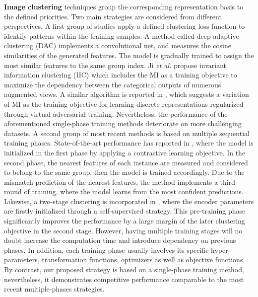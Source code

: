 \documentclass[journal]{IEEEtran}
\begin{document}
\par
\textbf{Image clustering} techniques group the corresponding representation basis to the defined priorities. Two main strategies are considered from different perspectives. A first group of studies \cite{DBLP:conf/iccv/ChangWMXP17,Ji_2019_ICCV, Yang2016JointUL,zhao2020deep} apply a defined clustering loss function to identify patterns within the training samples. A method called deep adaptive clustering (DAC) \cite{8237888} implements a convolutional net, and measures the cosine similarities of the generated features. The model is gradually trained to assign the most similar features to the same group index. Ji \textit{et al.} propose invariant information clustering (IIC) \cite{Ji_2019_ICCV} which includes the MI as a training objective to maximize the dependency between the categorical outputs of numerous augmented views. A similar algorithm is reported in \cite{Hu2017}, which suggests a variation of MI as the training objective for learning discrete representations regularized through virtual adversarial training. Nevertheless, the performance of the aforementioned single-phase training methods deteriorate on more challenging datasets. A second group of most recent methods is based on multiple sequential training phases. State-of-the-art performance has reported in \cite{vangansbeke2020scan}, where the model is initialized in the first phase by applying a contrastive learning objective. In the second phase, the  nearest features of each instance are measured and considered to belong to the same group, then the model is trained accordingly. Due to the mismatch prediction of the  nearest features, the method implements a third round of training, where the model learns from the most confident predictions. Likewise, a two-stage clustering is incorporated in \cite{eccv_han}, where the encoder parameters are firstly initialized through a self-supervised strategy. This pre-training phase significantly improves the performance by a large margin of the later clustering objective in the second stage. However, having multiple training stages will no doubt increase the computation time and introduce dependency on previous phases. In addition, each training phase usually involves its specific  hyper-parameters, transformation functions, optimizers as well as objective functions. By contrast, our proposed strategy is based on a single-phase training method, nevertheless, it demonstrates competitive performance comparable to the most recent multiple-phases strategies.
\end{document}
